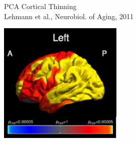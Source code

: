 \documentclass[8pt,xcolor=table]{beamer}
\begin{document}
\begin{frame}
\begin{figure}[h]
\begin{subfigure}[b]{0.3\textwidth}
  PCA Cortical Thinning\\ \small{Lehmann et al., Neurobiol. of Aging, 2011}

  \includegraphics[width=0.65\textwidth]{lehmann_2011_brain}
  \end{subfigure}
    
\end{figure}
\vspace{-2em}

\end{frame}






\newcommand{\ipmiPaperFold}{../}
\newcommand{\outFoldADNICVbrains}{\ipmiPaperFold/figures/crossvalid/adniThavgFWHM0Initk-meansCl3Pr0Ra1_VWDPMMean}
\newcommand{\scaleFig}{0.16}
\end{document}
